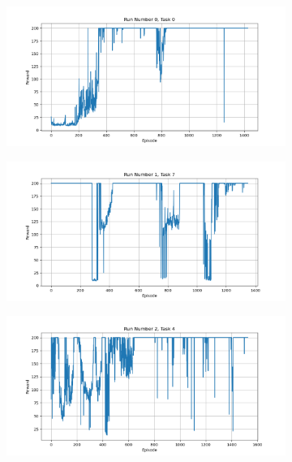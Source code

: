 \documentclass[runningheads]{llncs}
\begin{document}
\begin{figure}[H]
 \centering
 \begin{subfigure}{.45\textwidth}
     \centering
     \includegraphics[width=1\textwidth] {imgs/5000_episodes/Task_0_run_0}
 \end{subfigure}%
 \begin{subfigure}{.45\textwidth}
     \centering
     \includegraphics[width=1\textwidth] {imgs/5000_episodes/Task_7_run_1}
 \end{subfigure}
  \begin{subfigure}{.45\textwidth}
      \centering
      \includegraphics[width=1\textwidth] {imgs/5000_episodes/Task_4_run_2}

\end{subfigure}
\end{figure}
\end{document}
